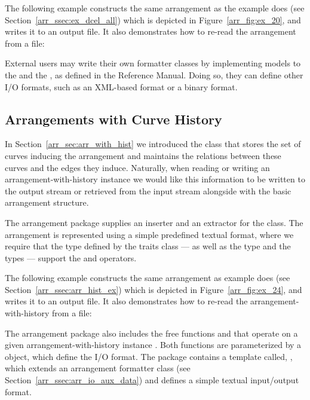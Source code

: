 \begin{ccAdvanced}
The following example constructs the same arrangement as the
example  does
(see Section~\ref{arr_ssec:ex_dcel_all}) which is depicted in
Figure~\ref{arr_fig:ex_20}, and writes it to an output file. It also
demonstrates how to re-read the arrangement from a file:


External users may write their own formatter classes by implementing
models to the  and the
, as defined in the Reference Manual.
Doing so, they can define other I/O formats, such as an XML-based
format or a binary format.
\end{ccAdvanced}

\subsection{Arrangements with Curve History\label{arr_ssec:arr_io_hist}}

In Section~\ref{arr_sec:arr_with_hist} we introduced the
 class that stores the
set of curves inducing the arrangement and maintains the relations between
these curves and the edges they induce. Naturally, when reading or writing an
arrangement-with-history instance we would like this information to be
written to the output stream or retrieved from the input stream alongside
with the basic arrangement structure.

The arrangement package supplies an inserter and an extractor for the
 class. The arrangement is
represented using a simple predefined textual format, where we require that
the  type defined by the traits class --- as well as the
 type and the  types --- support
the \ccc{<<} and\ccc{>>} operators.

The following example constructs the same arrangement as example
 does
(see Section~\ref{arr_ssec:arr_hist_ex}) which is depicted in
Figure~\ref{arr_fig:ex_24}, and writes it to an output file. It also
demonstrates how to re-read the arrangement-with-history from a file:


\begin{ccAdvanced}
The arrangement package also includes the free functions
 and  that
operate on a given arrangement-with-history instance .
Both functions are parameterized by a  object, which define
the I/O format. The package contains a template called,
, which extends
an arrangement formatter class (see Section~\ref{arr_ssec:arr_io_aux_data})
and defines a simple textual input/output format.
\end{ccAdvanced}
